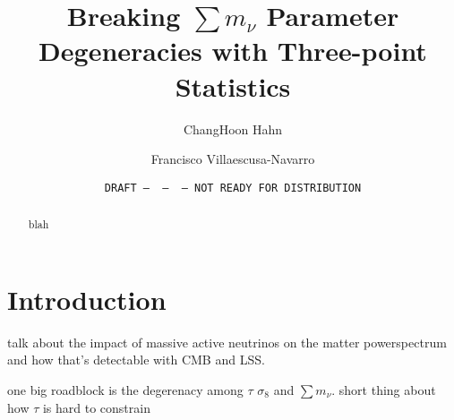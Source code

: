 \documentclass[12pt, letterpaper, preprint]{aastex62}
\newcommand{\smnu}{\sum m_\nu}
\begin{document}
\sloppy\sloppypar\frenchspacing 

\title{Breaking $\smnu$ Parameter Degeneracies with Three-point Statistics} 
\date{\texttt{DRAFT~---~\githash~---~\gitdate~---~NOT READY FOR DISTRIBUTION}}


%
%

\author{ChangHoon Hahn}

\author{Francisco Villaescusa-Navarro} 

\begin{abstract}
blah 
\end{abstract}


\section{Introduction}
talk about the impact of massive active neutrinos on the matter powerspectrum and how that's detectable with CMB and LSS. 

one big roadblock is the degerenacy among $\tau$ $\sigma_8$ and $\sum m_\nu$.
short thing about how $\tau$ is hard to constrain

\end{document}
